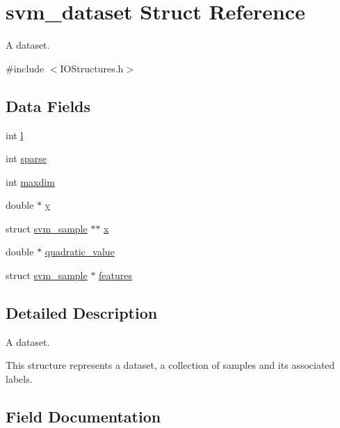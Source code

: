 \hypertarget{structsvm__dataset}{}\section{svm\+\_\+dataset Struct Reference}
\label{structsvm__dataset}


A dataset.  




{\ttfamily \#include $<$I\+O\+Structures.\+h$>$}

\subsection*{Data Fields}
\begin{DoxyCompactItemize}
\item 
int \hyperlink{structsvm__dataset_a899bdc43cdfb5e7063e8d7d1787357b4}{l}
\item 
int \hyperlink{structsvm__dataset_a58e8012a38ef5ea1c642db1b8c06b8bc}{sparse}
\item 
int \hyperlink{structsvm__dataset_aec1d1ee62ef8204fe90d8c6b7a647177}{maxdim}
\item 
double $\ast$ \hyperlink{structsvm__dataset_a2bce5da2f59f28fe18eff3f92f92c011}{y}
\item 
struct \hyperlink{structsvm__sample}{svm\+\_\+sample} $\ast$$\ast$ \hyperlink{structsvm__dataset_ad3e266a07c610ed3f10df1bab30fd9e5}{x}
\item 
double $\ast$ \hyperlink{structsvm__dataset_a4b1ff8b06358c73f6b55ecae7516d01e}{quadratic\+\_\+value}
\item 
struct \hyperlink{structsvm__sample}{svm\+\_\+sample} $\ast$ \hyperlink{structsvm__dataset_adb398643a3af457d1b18db0cb47c5a4c}{features}
\end{DoxyCompactItemize}


\subsection{Detailed Description}
A dataset. 

This structure represents a dataset, a collection of samples and its associated labels. 

\subsection{Field Documentation}
\hypertarget{structsvm__dataset_adb398643a3af457d1b18db0cb47c5a4c}{}\label{structsvm__dataset_adb398643a3af457d1b18db0cb47c5a4c} 

